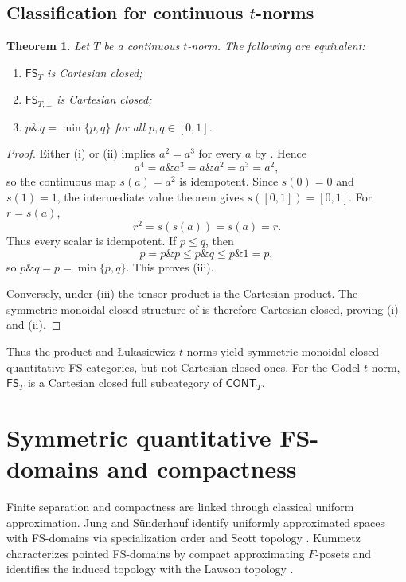 \documentclass[preprint,3p,times]{elsarticle}
\newtheorem{theorem}{Theorem}[section]
\theoremstyle{definition}
\theoremstyle{remark}
\newcommand{\FS}{\mathsf{FS}}
\newcommand{\CONT}{\mathsf{CONT}}
\newcommand{\tn}{\mathbin{\&}}
\numberwithin{equation}{section}
\begin{document}
\subsection{Classification for continuous \texorpdfstring{\(t\)}{t}-norms}

\begin{theorem}\label{thm:goedel-classification}
Let \(T\) be a continuous \(t\)-norm. The following are equivalent:
\begin{enumerate}[label=\textup{(\roman*)}]
 \item \(\FS_T\) is Cartesian closed;
 \item \(\FS_{T,\bot}\) is Cartesian closed;
 \item \(p\tn q=\min\{p,q\}\) for all \(p,q\in[0,1]\).
\end{enumerate}
\end{theorem}

\begin{proof}
Either \textup{(i)} or \textup{(ii)} implies \(a^2=a^3\) for every \(a\) by . Hence
\[
 a^4=a\tn a^3=a\tn a^2=a^3=a^2,
\]
so the continuous map \(s(a)=a^2\) is idempotent. Since \(s(0)=0\) and \(s(1)=1\), the intermediate value theorem gives \(s([0,1])=[0,1]\). For \(r=s(a)\),
\[
 r^2=s(s(a))=s(a)=r.
\]
Thus every scalar is idempotent. If \(p\leq q\), then
\[
 p=p\tn p\leq p\tn q\leq p\tn1=p,
\]
so \(p\tn q=p=\min\{p,q\}\). This proves \textup{(iii)}.

Conversely, under \textup{(iii)} the tensor product is the Cartesian product. The symmetric monoidal closed structure of  is therefore Cartesian closed, proving \textup{(i)} and \textup{(ii)}.
\end{proof}

Thus the product and \L{}ukasiewicz \(t\)-norms yield symmetric monoidal closed quantitative FS categories, but not Cartesian closed ones. For the G\"odel \(t\)-norm, \(\FS_T\) is a Cartesian closed full subcategory of \(\CONT_T\).

\section{Symmetric quantitative FS-domains and compactness}\label{sec:metric}
Finite separation and compactness are linked through classical uniform approximation. Jung and S\"underhauf identify uniformly approximated spaces with FS-domains via specialization order and Scott topology \cite[Theorem~21]{JungSunderhauf1998}. Kummetz characterizes pointed FS-domains by compact approximating \(F\)-posets and identifies the induced topology with the Lawson topology \cite[Theorem~4.3 and Corollary~4.6]{Kummetz1999}.
\end{document}
